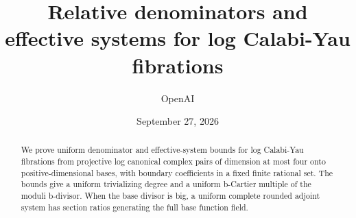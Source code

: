 \documentclass[11pt]{article}
\title{Relative denominators and effective systems for log Calabi-Yau fibrations}
\author{OpenAI}
\date{September 27, 2026}
\theoremstyle{definition}
\theoremstyle{remark}
\numberwithin{equation}{section}
\begin{document}
\maketitle
\begin{abstract}
We prove uniform denominator and effective-system bounds for log Calabi-Yau
fibrations from projective log canonical complex pairs of dimension at most
four onto positive-dimensional bases, with boundary coefficients in a fixed
finite rational set. The bounds give a uniform trivializing degree and a
uniform b-Cartier multiple of the moduli b-divisor. When the base divisor is
big, a uniform complete rounded adjoint system has section ratios generating
the full base function field.
\end{abstract}

\tableofcontents







\end{document}
